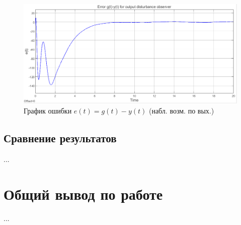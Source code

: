 \documentclass[a4paper, 12pt]{article}
\begin{document}
    \begin{figure}[H]
        \centering
        \includegraphics[scale=0.6]{3task_ey2.png}
        \captionsetup{skip=0pt}
        \caption{График ошибки $e(t)=g(t)-y(t)$ (набл. возм. по вых.)}
        \label{fig:3task_ey2}
    \end{figure}


    \subsection{Сравнение результатов}
    ...


    \section{Общий вывод по работе}
    ...
\end{document}
